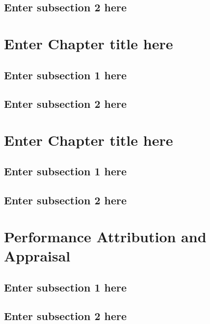 \documentclass[
]{book}
\begin{document}
\section{Enter subsection 2 here}\label{enter-subsection-2-here-3}

\chapter{Enter Chapter title here}\label{ch6}

\section{Enter subsection 1 here}\label{enter-subsection-1-here-4}

\section{Enter subsection 2 here}\label{enter-subsection-2-here-4}

\chapter{Enter Chapter title here}\label{ch7}

\section{Enter subsection 1 here}\label{enter-subsection-1-here-5}

\section{Enter subsection 2 here}\label{enter-subsection-2-here-5}

\chapter{Performance Attribution and Appraisal}\label{ch8}

\section{Enter subsection 1 here}\label{enter-subsection-1-here-6}

\section{Enter subsection 2 here}\label{enter-subsection-2-here-6}
\end{document}
